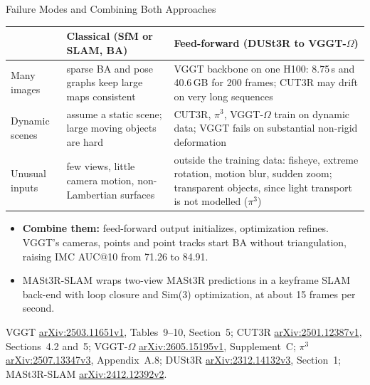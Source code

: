 \begin{frame}{Failure Modes and Combining Both Approaches}
  \centering
  {\footnotesize\setlength{\tabcolsep}{4pt}
  \begin{tabular}{>{\raggedright\arraybackslash}p{2.0cm} >{\raggedright\arraybackslash}p{5.0cm} >{\raggedright\arraybackslash}p{5.6cm}}
    \toprule
     & \textbf{Classical (SfM or SLAM, BA)} & \textbf{Feed-forward (DUSt3R to VGGT-$\Omega$)} \\
    \midrule
    Many images & sparse BA and pose graphs keep large maps consistent & VGGT backbone on one H100: 8.75\,s and 40.6\,GB for 200 frames; CUT3R may drift on very long sequences \\
    \addlinespace[0.3em]
    Dynamic scenes & assume a static scene; large moving objects are hard & CUT3R, $\pi^3$, VGGT-$\Omega$ train on dynamic data; VGGT fails on substantial non-rigid deformation \\
    \addlinespace[0.3em]
    Unusual inputs & few views, little camera motion, non-Lambertian surfaces & outside the training data: fisheye, extreme rotation, motion blur, sudden zoom; transparent objects, since light transport is not modelled ($\pi^3$) \\
    \bottomrule
  \end{tabular}\par}
  \begin{itemize}\footnotesize\itemsep0.3em
    \item \textbf{Combine them:} feed-forward output initializes, optimization refines. VGGT's cameras, points and point tracks start BA without triangulation, raising IMC AUC@10 from 71.26 to 84.91.
    \item MASt3R-SLAM wraps two-view MASt3R predictions in a keyframe SLAM back-end with loop closure and Sim(3) optimization, at about 15 frames per second.
  \end{itemize}
  \vspace{0.2em}
  {\scriptsize VGGT \href{https://arxiv.org/abs/2503.11651v1}{arXiv:2503.11651v1}, Tables~9--10, Section~5; CUT3R \href{https://arxiv.org/abs/2501.12387v1}{arXiv:2501.12387v1}, Sections~4.2 and~5; VGGT-$\Omega$ \href{https://arxiv.org/abs/2605.15195v1}{arXiv:2605.15195v1}, Supplement~C; $\pi^3$ \href{https://arxiv.org/abs/2507.13347v3}{arXiv:2507.13347v3}, Appendix~A.8; DUSt3R \href{https://arxiv.org/abs/2312.14132v3}{arXiv:2312.14132v3}, Section~1; MASt3R-SLAM \href{https://arxiv.org/abs/2412.12392v2}{arXiv:2412.12392v2}.\par}
\end{frame}
